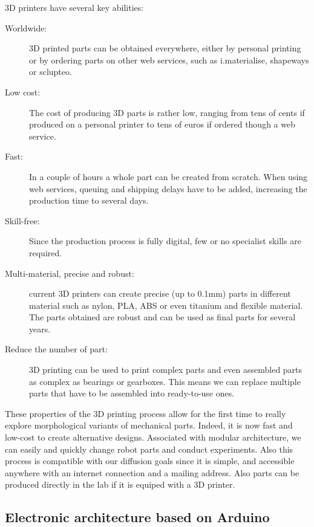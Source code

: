 3D printers have several key abilities:
\begin{description}
    \item[Worldwide:] 3D printed parts can be obtained everywhere, either by personal printing or by ordering parts on other web services, such as i.materialise, shapeways or sclupteo.
    \item[Low cost:] The cost of producing 3D parts is rather low, ranging from tens of cents if produced on a personal printer to tens of euros if ordered though a web service.
    \item[Fast:] In a couple of hours a whole part can be created from scratch. When using web services, queuing and shipping delays have to be added, increasing the production time to several days.
    \item[Skill-free:] Since the production process is fully digital, few or no specialist skills are required.
    \item[Multi-material, precise and robust:] current 3D printers can create precise (up to 0.1mm) parts in different material such as nylon, PLA, ABS or even titanium and flexible material. The parts obtained are robust and can be used as final parts for several years.
    \item[Reduce the number of part:] 3D printing  can be used to print complex parts and even assembled parts as complex as bearings or gearboxes. This means we can replace multiple parts that have to be assembled into ready-to-use ones.
\end{description}

These properties of the 3D printing process allow for the first time to really explore morphological variants of mechanical parts. Indeed, it is now fast and low-cost to create alternative designs. Associated with modular architecture, we can easily and quickly change robot parts and conduct experiments. Also this process is compatible with our diffusion goals since it is simple, and accessible anywhere with an internet connection and a mailing address. Also parts can be produced directly in the lab if it is equiped with a 3D printer.


\subsection{Electronic architecture based on Arduino} %
\label{sec:methodo-arduino}

